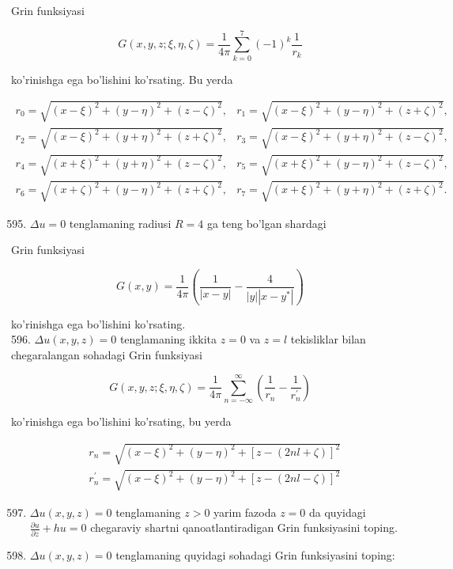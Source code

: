 \documentclass[10pt]{article}
\begin{document}
Grin funksiyasi

$$
G(x, y, z ; \xi, \eta, \zeta)=\frac{1}{4 \pi} \sum_{k=0}^{7}(-1)^{k} \frac{1}{r_{k}}
$$

ko'rinishga ega bo'lishini ko'rsating. Bu yerda

$$
\begin{array}{ll}
r_{0}=\sqrt{(x-\xi)^{2}+(y-\eta)^{2}+(z-\zeta)^{2}}, & r_{1}=\sqrt{(x-\xi)^{2}+(y-\eta)^{2}+(z+\zeta)^{2}}, \\
r_{2}=\sqrt{(x-\xi)^{2}+(y+\eta)^{2}+(z+\zeta)^{2}}, & r_{3}=\sqrt{(x-\xi)^{2}+(y+\eta)^{2}+(z-\zeta)^{2}}, \\
r_{4}=\sqrt{(x+\xi)^{2}+(y+\eta)^{2}+(z-\zeta)^{2}}, & r_{5}=\sqrt{(x+\xi)^{2}+(y-\eta)^{2}+(z-\zeta)^{2}}, \\
r_{6}=\sqrt{(x+\zeta)^{2}+(y-\eta)^{2}+(z+\zeta)^{2}}, & r_{7}=\sqrt{(x+\xi)^{2}+(y+\eta)^{2}+(z+\zeta)^{2}} .
\end{array}
$$

\begin{enumerate}
  \setcounter{enumi}{594}
  \item $\Delta u=0$ tenglamaning radiusi $R=4$ ga teng bo'lgan shardagi
\end{enumerate}

Grin funksiyasi

$$
G(x, y)=\frac{1}{4 \pi}\left(\frac{1}{|x-y|}-\frac{4}{|y|\left|x-y^{*}\right|}\right)
$$

ko'rinishga ega bo'lishini ko'rsating.\\
596. $\Delta u(x, y, z)=0$ tenglamaning ikkita $z=0$ va $z=l$ tekisliklar bilan chegaralangan sohadagi Grin funksiyasi

$$
G(x, y, z ; \xi, \eta, \zeta)=\frac{1}{4 \pi} \sum_{n=-\infty}^{\infty}\left(\frac{1}{r_{n}}-\frac{1}{r_{n}^{\prime}}\right)
$$

ko'rinishga ega bo'lishini ko'rsating, bu yerda

$$
\begin{aligned}
& r_{n}=\sqrt{(x-\xi)^{2}+(y-\eta)^{2}+[z-(2 n l+\zeta)]^{2}} \\
& r_{n}^{\prime}=\sqrt{(x-\xi)^{2}+(y-\eta)^{2}+[z-(2 n l-\zeta)]^{2}}
\end{aligned}
$$

\begin{enumerate}
  \setcounter{enumi}{596}
  \item $\Delta u(x, y, z)=0$ tenglamaning $z>0$ yarim fazoda $z=0$ da quyidagi $\frac{\partial u}{\partial z}+h u=0$ chegaraviy shartni qanoatlantiradigan Grin funksiyasini toping.
  \item $\Delta u(x, y, z)=0$ tenglamaning quyidagi sohadagi Grin funksiyasini toping:
\end{enumerate}
\end{document}
